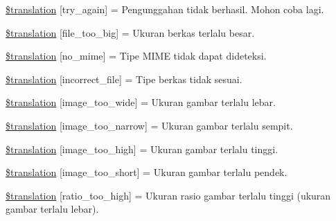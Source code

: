 \begin{DoxyCompactItemize}
\item 
\hyperlink{class_8upload_8id___i_d_8php_a3afc377bd803683314f413a814243066}{\$translation} \mbox{[}\textquotesingle{}try\+\_\+again\textquotesingle{}\mbox{]} = \textquotesingle{}Pengunggahan tidak berhasil. Mohon coba lagi.\textquotesingle{}
\item 
\hyperlink{class_8upload_8id___i_d_8php_a476278eb4a0c3df56af068e2d511a741}{\$translation} \mbox{[}\textquotesingle{}file\+\_\+too\+\_\+big\textquotesingle{}\mbox{]} = \textquotesingle{}Ukuran berkas terlalu besar.\textquotesingle{}
\item 
\hyperlink{class_8upload_8id___i_d_8php_a191a55df8e3bb7f3c51b70f3c1932e02}{\$translation} \mbox{[}\textquotesingle{}no\+\_\+mime\textquotesingle{}\mbox{]} = \textquotesingle{}Tipe M\+I\+M\+E tidak dapat dideteksi.\textquotesingle{}
\item 
\hyperlink{class_8upload_8id___i_d_8php_a4d32343e2699edd6fd435f9c832cb9c7}{\$translation} \mbox{[}\textquotesingle{}incorrect\+\_\+file\textquotesingle{}\mbox{]} = \textquotesingle{}Tipe berkas tidak sesuai.\textquotesingle{}
\item 
\hyperlink{class_8upload_8id___i_d_8php_a0dd3e4930ca1f59ae280f4b1006525cd}{\$translation} \mbox{[}\textquotesingle{}image\+\_\+too\+\_\+wide\textquotesingle{}\mbox{]} = \textquotesingle{}Ukuran gambar terlalu lebar.\textquotesingle{}
\item 
\hyperlink{class_8upload_8id___i_d_8php_a5c9a4cd67fd21c32e0a3b434591a6037}{\$translation} \mbox{[}\textquotesingle{}image\+\_\+too\+\_\+narrow\textquotesingle{}\mbox{]} = \textquotesingle{}Ukuran gambar terlalu sempit.\textquotesingle{}
\item 
\hyperlink{class_8upload_8id___i_d_8php_aa27bde361343f3b63c7cd441860024f8}{\$translation} \mbox{[}\textquotesingle{}image\+\_\+too\+\_\+high\textquotesingle{}\mbox{]} = \textquotesingle{}Ukuran gambar terlalu tinggi.\textquotesingle{}
\item 
\hyperlink{class_8upload_8id___i_d_8php_a86fcd4e1157b00032df451188d735527}{\$translation} \mbox{[}\textquotesingle{}image\+\_\+too\+\_\+short\textquotesingle{}\mbox{]} = \textquotesingle{}Ukuran gambar terlalu pendek.\textquotesingle{}
\item 
\hyperlink{class_8upload_8id___i_d_8php_a23396f6ce7f31e5e5f1b57580621d982}{\$translation} \mbox{[}\textquotesingle{}ratio\+\_\+too\+\_\+high\textquotesingle{}\mbox{]} = \textquotesingle{}Ukuran rasio gambar terlalu tinggi (ukuran gambar terlalu lebar).\textquotesingle{}
\item 

\end{DoxyCompactItemize}
